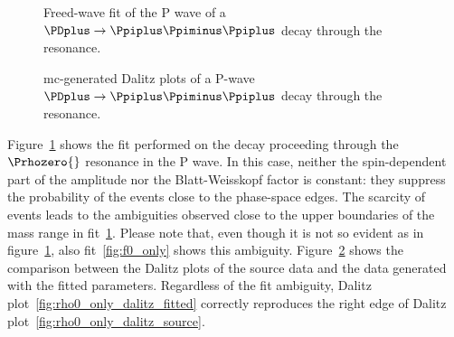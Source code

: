     \begin{figure}
        \centering

        \subfloat[][]{}

        \subfloat[][]{}

        \caption{Freed-wave fit of the P wave of a $\PDplus \to \Ppiplus\Ppiminus\Ppiplus$ decay through the \Prhozero{} resonance.~\Star}
        \label{fig:rho0_only}
    \end{figure}
    \begin{figure}
        \centering


        \caption{\ac{mc}-generated Dalitz plots of a P-wave $\PDplus \to \Ppiplus\Ppiminus\Ppiplus$ decay through the \Prhozero{} resonance.~\Star}
        \label{fig:rho0_only_dalitz}

    \end{figure}
    Figure~\ref{fig:rho0_only} shows the fit performed on the decay proceeding through the $\Prhozero{}$ resonance in the P wave.
    In this case, neither the spin-dependent part of the amplitude nor the Blatt-Weisskopf factor is constant: they suppress the probability of the events close to the phase-space edges.
    The scarcity of events leads to the ambiguities observed close to the upper boundaries of the mass range in fit~\ref{fig:rho0_only}.
    Please note that, even though it is not so evident as in figure~\ref{fig:rho0_only}, also fit~\ref{fig:f0_only} shows this ambiguity.
    Figure~\ref{fig:rho0_only_dalitz} shows the comparison between the Dalitz plots of the source data and the data generated with the fitted parameters.
    Regardless of the fit ambiguity, Dalitz plot~\ref{fig:rho0_only_dalitz_fitted} correctly reproduces the right edge of Dalitz plot~\ref{fig:rho0_only_dalitz_source}.


